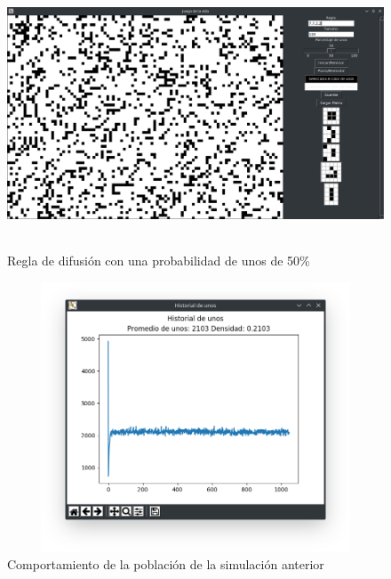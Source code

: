 \begin{figure}[H]
\begin{center}
 \includegraphics[width=12cm, height=8cm]{./img/diffusion50.png}
 \caption{Regla de difusión con una probabilidad de unos de 50\%}
 \label{fig:diffusion50}
\end{center}
\end{figure}

\begin{figure}[H]
\begin{center}
 \includegraphics[width=12cm, height=8cm]{./img/diffusion50grafica.png}
 \caption{Comportamiento de la población de la simulación anterior}
 \label{fig:diffusion50grafica}
\end{center}
\end{figure}

